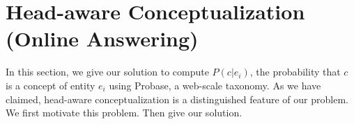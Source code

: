 \section{Head-aware Conceptualization (Online Answering)}
\label{sec:conceptualization}
In this section, we give our solution to compute $P(c|e_i)$, the probability that $c$ is a concept of entity $e_i$ using \ac{Probase}, a web-scale taxonomy.
As we have claimed, head-aware conceptualization is a distinguished feature of our problem.
We first motivate this problem. Then give our solution.

%
%
%

\vspace{-2mm}
